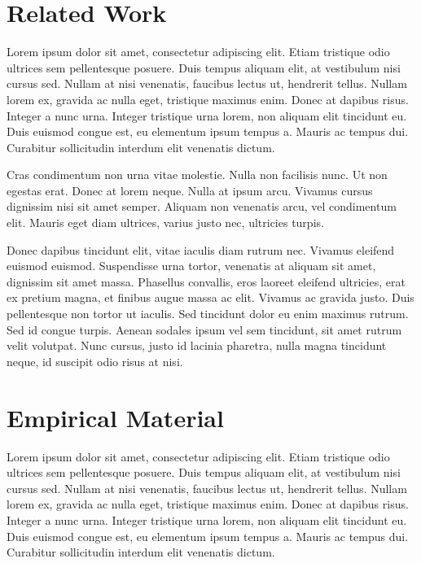 \documentclass[11pt, a4paper]{resources/JTH}
\begin{document}
\section{Related Work}
\label{chap:RelatedWork}

Lorem ipsum dolor sit amet, consectetur adipiscing elit. Etiam tristique odio ultrices sem pellentesque posuere. Duis tempus aliquam elit, at vestibulum nisi cursus sed. Nullam at nisi venenatis, faucibus lectus ut, hendrerit tellus. Nullam lorem ex, gravida ac nulla eget, tristique maximus enim. Donec at dapibus risus. Integer a nunc urna. Integer tristique urna lorem, non aliquam elit tincidunt eu. Duis euismod congue est, eu elementum ipsum tempus a. Mauris ac tempus dui. Curabitur sollicitudin interdum elit venenatis dictum.

Cras condimentum non urna vitae molestie. Nulla non facilisis nunc. Ut non egestas erat. Donec at lorem neque. Nulla at ipsum arcu. Vivamus cursus dignissim nisi sit amet semper. Aliquam non venenatis arcu, vel condimentum elit. Mauris eget diam ultrices, varius justo nec, ultricies turpis.

Donec dapibus tincidunt elit, vitae iaculis diam rutrum nec. Vivamus eleifend euismod euismod. Suspendisse urna tortor, venenatis at aliquam sit amet, dignissim sit amet massa. Phasellus convallis, eros laoreet eleifend ultricies, erat ex pretium magna, et finibus augue massa ac elit. Vivamus ac gravida justo. Duis pellentesque non tortor ut iaculis. Sed tincidunt dolor eu enim maximus rutrum. Sed id congue turpis. Aenean sodales ipsum vel sem tincidunt, sit amet rutrum velit volutpat. Nunc cursus, justo id lacinia pharetra, nulla magna tincidunt neque, id suscipit odio risus at nisi.

\section{Empirical Material}
\label{chap:EmpiricalMaterial}

Lorem ipsum dolor sit amet, consectetur adipiscing elit. Etiam tristique odio ultrices sem pellentesque posuere. Duis tempus aliquam elit, at vestibulum nisi cursus sed. Nullam at nisi venenatis, faucibus lectus ut, hendrerit tellus. Nullam lorem ex, gravida ac nulla eget, tristique maximus enim. Donec at dapibus risus. Integer a nunc urna. Integer tristique urna lorem, non aliquam elit tincidunt eu. Duis euismod congue est, eu elementum ipsum tempus a. Mauris ac tempus dui. Curabitur sollicitudin interdum elit venenatis dictum.
\end{document}
